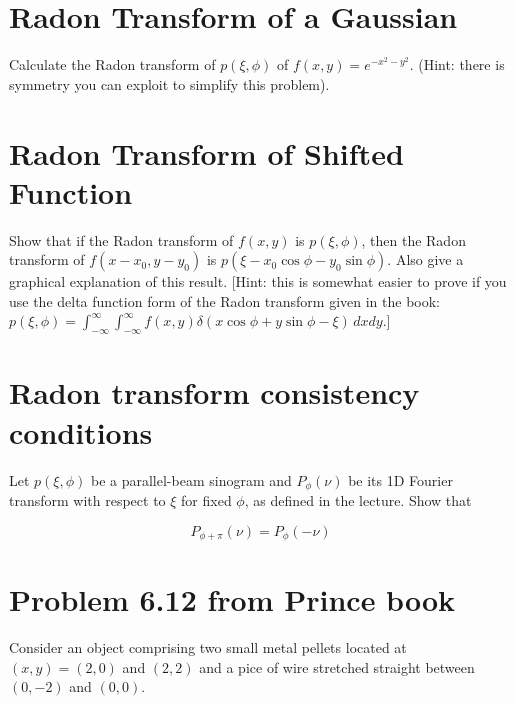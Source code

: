 \documentclass{article}
\begin{document}
\section{Radon Transform of a Gaussian}

Calculate the Radon transform of $p(\xi, \phi)$ of $f(x,y) = e^{-x^2 - y^2}$. (Hint: there is symmetry you can exploit to simplify this problem).

\vspace{12pt}


\section{Radon Transform of Shifted Function}

Show that if the Radon transform of $f(x,y)$ is $p(\xi,\phi)$, then the Radon transform of $f(x-x_0,y-y_0)$ is $p(\xi-x_0\cos{\phi} - y_0\sin{\phi})$. Also give a graphical explanation of this result. [Hint: this is somewhat easier to prove if you use the delta function form of the Radon transform given in the book: $p(\xi,\phi) = \int_{-\infty}^\infty \int_{-\infty}^{\infty} f(x,y)\delta(x\cos{\phi} + y\sin{\phi} - \xi)\,dxdy$.]

\vspace{12pt}


\section{Radon transform consistency conditions}

Let $p(\xi,\phi)$ be a parallel-beam sinogram and $P_\phi(\nu)$ be its 1D Fourier transform with respect to $\xi$ for fixed $\phi$, as defined in the lecture. Show that 

$$
P_{\phi + \pi}(\nu) = P_{\phi}(-\nu)
$$

\vspace{12pt}


\section{Problem 6.12 from Prince book}

Consider an object comprising two small metal pellets located at $(x,y) = (2,0)$ and $(2,2)$ and a pice of wire stretched straight between $(0,-2)$ and $(0,0)$.\\
\end{document}
